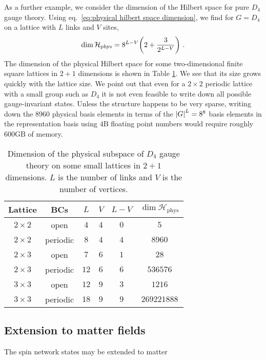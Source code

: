 As a further example, we consider the dimension of the Hilbert space for pure $D_4$ gauge theory.
Using eq.~\eqref{eq:physical hilbert space dimension}, we find for $G=D_4$ on a lattice with $L$ links and $V$ sites,
\begin{equation}
    \dim{\mathcal{H}_{\mathrm{phys}}} = 8^{L-V}\pqty{2+\frac{3}{2^{L-V}}} \ .
\end{equation}
The dimension of the physical Hilbert space for some two-dimensional finite square lattices in $2+1$ dimensions is shown in Table \ref{tab:numstates}.
We see that its size grows quickly with the lattice size.
We point out that even for a $2 \times 2$ periodic lattice with a small group such as $D_4$ it is not even feasible to write down all possible gauge-invariant states.
Unless the structure happens to be very sparse, writing down the $8960$ physical basis elements in terms of the $\abs{G}^L = 8^8$ basis elements in the representation basis using $4 \mathrm{B}$ floating point numbers would require roughly $600 \mathrm{GB}$ of memory.
\begin{table}[h]
    \centering
    \begin{tabular}{c|ccccc}
         Lattice & BCs & $L$ & $V$ & $L-V$ &$\dim{\mathcal{H}_{\mathrm{phys}}}$\\
         \hline
         $2 \times 2$ & open & $4$ & $4$ & $0$ & $5$\\
         \hline
         $2 \times 2$ & periodic & $8$ & $4$ & $4$ & $8960$ \\
         \hline
         $2 \times 3$ & open & $7$ & $6$ & $1$ & $28$ \\
         \hline
         $2 \times 3$ & periodic & $12$ & $6$ & $6$ & $536576$ \\
         \hline
         $3 \times 3$ & open & $12$ & $9$ & $3$ & $1216$ \\
         \hline
         $3 \times 3$ & periodic & $18$ & $9$ & $9$ & $269221888$
    \end{tabular}
    \caption{Dimension of the physical subspace of $D_4$ gauge theory on some small lattices in $2+1$ dimensions.
$L$ is the number of links and $V$ is the number of vertices.}
    \label{tab:numstates}
    \vspace{-6mm}
\end{table}

\subsection{Extension to matter fields} \label{sec:spin networks matter}

The spin network states may be extended to matter
